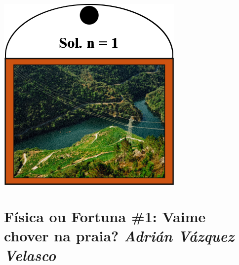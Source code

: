 \begin{refsection}
\begin{multicols}{2}
\nocite{Demaine_2013}
\printbibliography
\hfill
\goodbreak

\begin{center}
    \captionsetup{justification=centering}
    \includegraphics[width=0.7\linewidth]{revistas/002/imaxes/solucion_victor.png}
    \label{fig:solucion_victor}
\end{center}

\end{multicols}
\end{refsection}


\section*{\textcolor{Resalte}{Física ou Fortuna \#1: Vaime chover na praia?} {\normalfont \itshape Adrián Vázquez Velasco}}%

